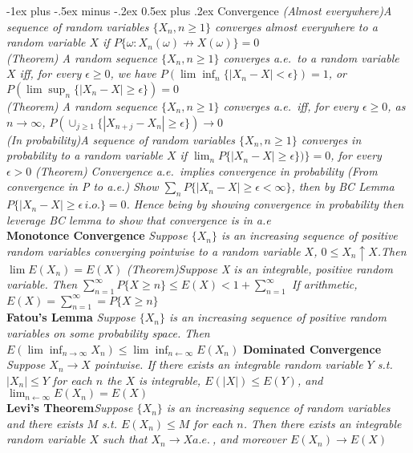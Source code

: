 \documentclass[10pt,landscape]{article}
\makeatletter
\renewcommand{\section}{\@startsection{section}{1}{0mm}%
                                {-1ex plus -.5ex minus -.2ex}%
                                {0.5ex plus .2ex}%
                                {\normalfont\large\bfseries}}
\makeatother
\begin{document}
\begin{multicols*}{3}
\section{Convergence}
\textit{(Almost everywhere)A sequence of random variables $\{X_n,n\geq 1\}$ converges almost everywhere to a random variable $X$ if $P\{\omega:X_{n}(\omega) \not\rightarrow X(\omega)\}=0$}\\
\textit{(Theorem) A random sequence $\{X_n, n\geq1\}$ converges a.e.\ to a random variable $X$ iff, for every $\epsilon\geq0$, we have $P(\lim\inf_n\{|X_n-X|<\epsilon\})=1$, or  $P(\lim\sup_n\{|X_n-X|\geq\epsilon\})=0$}\\
\textit{(Theorem) A random sequence $\{X_n, n\geq1\}$ converges a.e.\ iff, for every $\epsilon\geq0$, as $n\rightarrow \infty$, $P(\cup_{j\geq 1}\{|X_{n+j}-X_n|\geq\epsilon\})\rightarrow0$}\\
\textit{(In probability)A sequence of random variables $\{X_n,n\geq 1\}$ converges in probability to a random variable $X$ if $\lim_n P\{|X_n-X|\geq\epsilon\})\}=0$, for every $\epsilon>0$}
\textit{(Theorem) Convergence a.e.\ implies convergence in probability}
\textit{(From convergence in P to a.e.) Show $\sum_{n}P\{|X_n-X|\geq \epsilon <\infty\}$, then by BC Lemma $P\{|X_n-X|\geq \epsilon \,i.o. \}=0$. Hence being by showing convergence in probability then leverage BC lemma to show that convergence is in a.e}\\ 
\textbf{Monotonce Convergence} \textit{Suppose $\{X_n\}$ is an increasing sequence of positive random variables converging pointwise to a random variable $X$, $0\leq X_n \uparrow X$.Then $\lim E(X_n)= E(X)$}
\textit{(Theorem)Suppose X is an integrable, positive random variable. Then $\sum_{n=1}^{\infty}P\{X\geq n\}\leq E(X) < 1+ \sum_{n=1}^{\infty}$ If arithmetic, $E(X)=\sum_{n=1}^{\infty}=P\{X\geq n\}$} \\
\textbf{Fatou's Lemma} \textit{Suppose $\{X_n\}$ is an increasing sequence of positive random variables on some probability space. Then $E(\lim\inf_{n\rightarrow \infty}X_n)\leq \lim\inf_{n\leftarrow\infty}E(X_n)$}
\textbf{Dominated Convergence} \textit{Suppose $X_n \rightarrow X$ pointwise. If there exists an integrable random variable $Y$ s.t. $|X_n|\leq Y$ for each $n$ the $X$ is integrable, $E(|X|)\leq E(Y)$, and $\lim_{n\leftarrow\infty}E(X_n)=E(X)$}\\
\textbf{Levi's Theorem}\textit{Suppose $\{X_n\}$ is an increasing sequence of random variables and there exists $M$ s.t. $E(X_n) \leq M$ for each $n$. Then there exists an integrable random variable $X$ such that $X_n \rightarrow X a.e.\ $, and moreover $E(X_n) \rightarrow E(X)$}\\

\end{multicols*}
\end{document}
